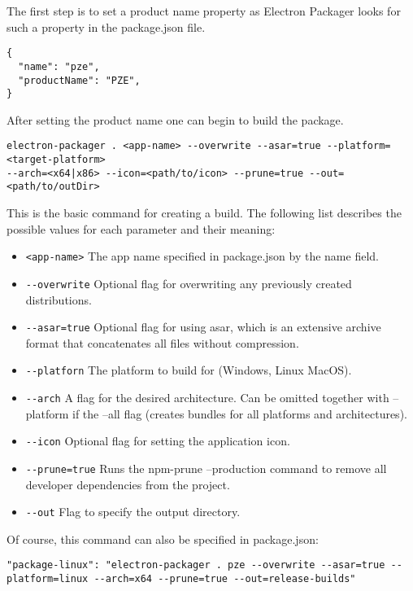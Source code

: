 The first step is to set a product name property as Electron Packager looks for such a property in the package.json file.
\begin{lstlisting}[caption=Product name property in package.json]
{
  "name": "pze",
  "productName": "PZE",
}
\end{lstlisting}
After setting the product name one can begin to build the package.
\begin{lstlisting}[caption=Command for using Electron Packager]
electron-packager . <app-name> --overwrite --asar=true --platform=<target-platform>
--arch=<x64|x86> --icon=<path/to/icon> --prune=true --out=<path/to/outDir>
\end{lstlisting}
This is the basic command for creating a build. 
The following list describes the possible values for each parameter and their meaning:
\begin{itemize}
    \item \lstinline[columns=fixed]{<app-name>} The app name specified in package.json by the name field.
    \item \lstinline[columns=fixed]{--overwrite} Optional flag for overwriting any previously created distributions.
    \item \lstinline[columns=fixed]{--asar=true} Optional flag for using asar, which is an extensive archive format
    that concatenates all files without compression.
    \item \lstinline[columns=fixed]{--platforn} The platform to build for (Windows, Linux MacOS).
    \item \lstinline[columns=fixed]{--arch} A flag for the desired architecture. 
    Can be omitted together with --platform if the --all flag (creates bundles for all
    platforms and architectures).
    \item \lstinline[columns=fixed]{--icon} Optional flag for setting the application icon.
    \item \lstinline[columns=fixed]{--prune=true} Runs the npm-prune --production command to remove all developer dependencies
    from the project.
    \item \lstinline[columns=fixed]{--out} Flag to specify the output directory.
\end{itemize}
Of course, this command can also be specified in package.json:
\begin{lstlisting}[caption=Command for Linux build specified in package.json]
"package-linux": "electron-packager . pze --overwrite --asar=true --platform=linux --arch=x64 --prune=true --out=release-builds"
\end{lstlisting}
